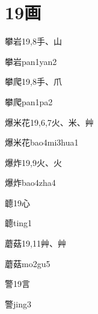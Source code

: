
\section*{19画}

\begin{entry}{攀岩}{19,8}{⼿、⼭}
  \begin{phonetics}{攀岩}{pan1yan2}
  \end{phonetics}
\end{entry}

\begin{entry}{攀爬}{19,8}{⼿、⽖}
  \begin{phonetics}{攀爬}{pan1pa2}
  \end{phonetics}
\end{entry}

\begin{entry}{爆米花}{19,6,7}{⽕、⽶、⾋}
  \begin{phonetics}{爆米花}{bao4mi3hua1}
  \end{phonetics}
\end{entry}

\begin{entry}{爆炸}{19,9}{⽕、⽕}
  \begin{phonetics}{爆炸}{bao4zha4}
  \end{phonetics}
\end{entry}

\begin{entry}{聼}{19}{⼼}
  \begin{phonetics}{聼}{ting1}
  \end{phonetics}
\end{entry}

\begin{entry}{蘑菇}{19,11}{⾋、⾋}
  \begin{phonetics}{蘑菇}{mo2gu5}
  \end{phonetics}
\end{entry}

\begin{entry}{警}{19}{⾔}
  \begin{phonetics}{警}{jing3}
  \end{phonetics}
\end{entry}

